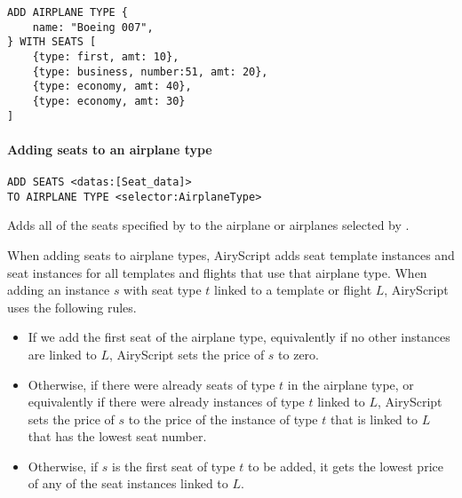 \begin{texa}
  {
\begin{lstlisting}
ADD AIRPLANE TYPE {
    name: "Boeing 007",
} WITH SEATS [
    {type: first, amt: 10},
    {type: business, number:51, amt: 20},
    {type: economy, amt: 40},
    {type: economy, amt: 30}
]
\end{lstlisting}
  }
\end{texa}

\paragraph{Adding seats to an airplane type}
\begin{operation}
  \begin{lstlisting}
ADD SEATS <datas:[Seat_data]>
TO AIRPLANE TYPE <selector:AirplaneType>
  \end{lstlisting}
  \label{op:add_seats}
\end{operation}
Adds all of the seats specified by  to the airplane or airplanes
selected by .

When adding seats to airplane types, AiryScript adds seat template instances and
seat instances for all templates and flights that use that airplane type. 
When adding an instance $s$ with seat type $t$ linked to a template or flight
$L$, AiryScript uses the following rules.
\begin{itemize}
  \item If we add the first seat of the airplane type, equivalently if no other
    instances are linked to $L$, AiryScript sets the price of $s$ to zero.
  \item Otherwise, if there were already seats of type $t$ in the airplane type,
    or equivalently if there were already instances of type $t$ linked to $L$,
    AiryScript sets the price of $s$ to the price of the instance of type $t$
    that is linked to $L$ that has the lowest seat number.
  \item Otherwise, if $s$ is the first seat of type $t$ to be added, it gets the
    lowest price of any of the seat instances linked to $L$.
\end{itemize}

